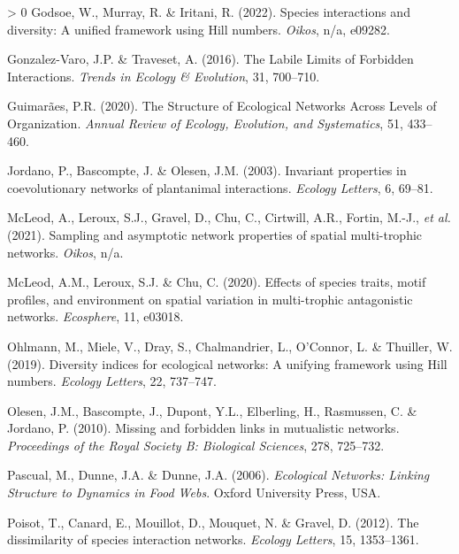 \documentclass[10pt,oneside]{article}
\newlength{\cslhangindent}
\newenvironment{CSLReferences}[3] %
 {%
  \setlength{\parindent}{0pt}
  \ifodd #1 \everypar{\setlength{\hangindent}{\cslhangindent}}\ignorespaces\fi
  \ifnum #2 > 0
  \setlength{\parskip}{#2\baselineskip}
  \fi
 }%
 {}
\begin{document}
\begin{CSLReferences}{1}{0}
\leavevmode\hypertarget{ref-Godsoe2022SpeInt}{}%
Godsoe, W., Murray, R. \& Iritani, R. (2022). Species interactions and
diversity: A unified framework using Hill numbers. \emph{Oikos}, n/a,
e09282.

\leavevmode\hypertarget{ref-Gonzalez-Varo2016Labilea}{}%
Gonzalez-Varo, J.P. \& Traveset, A. (2016). The Labile Limits of
Forbidden Interactions. \emph{Trends in Ecology \& Evolution}, 31,
700--710.

\leavevmode\hypertarget{ref-Guimaraes2020StrEco}{}%
Guimarães, P.R. (2020). The Structure of Ecological Networks Across
Levels of Organization. \emph{Annual Review of Ecology, Evolution, and
Systematics}, 51, 433--460.

\leavevmode\hypertarget{ref-Jordano2003Invarianta}{}%
Jordano, P., Bascompte, J. \& Olesen, J.M. (2003). Invariant properties
in coevolutionary networks of plantanimal interactions. \emph{Ecology
Letters}, 6, 69--81.

\leavevmode\hypertarget{ref-McLeod2021Sampling}{}%
McLeod, A., Leroux, S.J., Gravel, D., Chu, C., Cirtwill, A.R., Fortin,
M.-J., \emph{et al.} (2021). Sampling and asymptotic network properties
of spatial multi-trophic networks. \emph{Oikos}, n/a.

\leavevmode\hypertarget{ref-McLeod2020EffSpe}{}%
McLeod, A.M., Leroux, S.J. \& Chu, C. (2020). Effects of species traits,
motif profiles, and environment on spatial variation in multi-trophic
antagonistic networks. \emph{Ecosphere}, 11, e03018.

\leavevmode\hypertarget{ref-Ohlmann2019DivInd}{}%
Ohlmann, M., Miele, V., Dray, S., Chalmandrier, L., O'Connor, L. \&
Thuiller, W. (2019). Diversity indices for ecological networks: A
unifying framework using Hill numbers. \emph{Ecology Letters}, 22,
737--747.

\leavevmode\hypertarget{ref-Olesen2010Missing}{}%
Olesen, J.M., Bascompte, J., Dupont, Y.L., Elberling, H., Rasmussen, C.
\& Jordano, P. (2010). Missing and forbidden links in mutualistic
networks. \emph{Proceedings of the Royal Society B: Biological
Sciences}, 278, 725--732.

\leavevmode\hypertarget{ref-Pascual2006EcoNet}{}%
Pascual, M., Dunne, J.A. \& Dunne, J.A. (2006). \emph{Ecological
Networks: Linking Structure to Dynamics in Food Webs}. Oxford University
Press, USA.

\leavevmode\hypertarget{ref-Poisot2012Dissimilaritya}{}%
Poisot, T., Canard, E., Mouillot, D., Mouquet, N. \& Gravel, D. (2012).
The dissimilarity of species interaction networks. \emph{Ecology
Letters}, 15, 1353--1361.


\end{CSLReferences}
\end{document}
